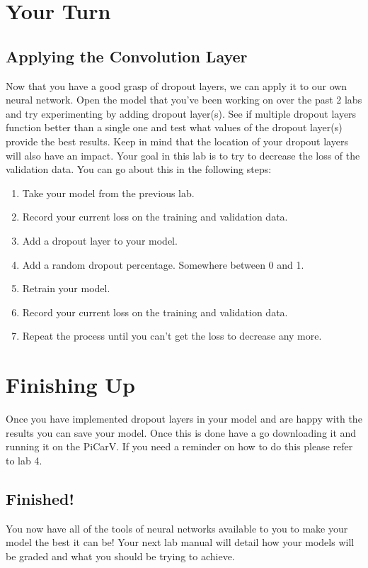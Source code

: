 \documentclass[11pt]{report}
\begin{document}


\chapter{Your Turn}
\section{Applying the Convolution Layer}
Now that you have a good grasp of dropout layers, we can apply it to our own neural network. Open the model that you've been working on over the past 2 labs and try experimenting by adding dropout layer(s). See if multiple dropout layers function better than a single one and test what values of the dropout layer(s) provide the best results. Keep in mind that the location of your dropout layers will also have an impact.
Your goal in this lab is to try to decrease the loss of the validation data. You can go about this in the following steps:

\begin{enumerate}
    \item{Take your model from the previous lab.}
    \item{Record your current loss on the training and validation data.}
    \item{Add a dropout layer to your model.}
    \item{Add a random dropout percentage. Somewhere between 0 and 1.}
    \item{Retrain your model.}
    \item{Record your current loss on the training and validation data.}
    \item{Repeat the process until you can't get the loss to decrease any more.}
\end{enumerate}


\pagebreak

\chapter{Finishing Up}

Once you have implemented dropout layers in your model and are happy with the results you can save your model. Once this is done have a go downloading it and running it on the PiCarV. If you need a reminder on how to do this please refer to lab 4.

\section{Finished!}
You now have all of the tools of neural networks available to you to make your model the best it can be! Your next lab manual will detail how your models will be graded and what you should be trying to achieve.
\end{document}
